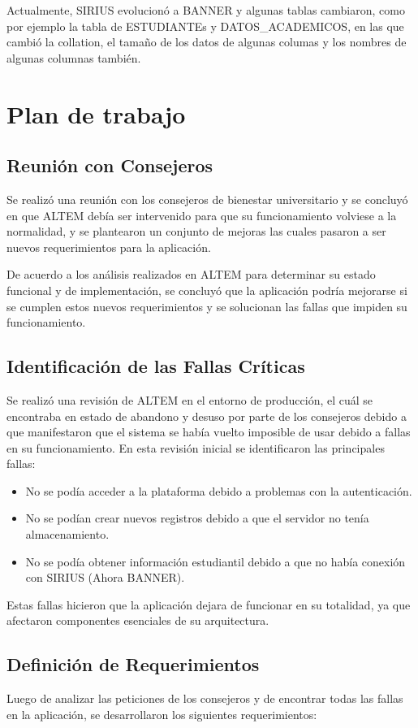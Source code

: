 Actualmente, SIRIUS evolucionó a BANNER y algunas tablas cambiaron, como por ejemplo la tabla de ESTUDIANTEs y DATOS\_ACADEMICOS, en las que cambió la collation, el tamaño de los datos de algunas columas y los nombres de algunas columnas también.

\section{Plan de trabajo}
\subsection{Reunión con Consejeros}
Se realizó una reunión con los consejeros de bienestar universitario y se concluyó en que ALTEM debía ser intervenido para que su funcionamiento volviese a la normalidad, y se plantearon un conjunto de mejoras las cuales pasaron a ser nuevos requerimientos para la aplicación.

De acuerdo a los análisis realizados en ALTEM para determinar su estado funcional y de implementación, se concluyó que la aplicación podría mejorarse si se cumplen estos nuevos requerimientos y se solucionan las fallas que impiden su funcionamiento.

\subsection{Identificación de las Fallas Críticas}
Se realizó una revisión de ALTEM en el entorno de producción, el cuál se encontraba en estado de abandono y desuso por parte de los consejeros debido a que manifestaron que el sistema se había vuelto imposible de usar debido a fallas en su funcionamiento. 
En esta revisión inicial se identificaron las principales fallas: 

\begin{itemize}
    \item No se podía acceder a la plataforma debido a problemas con la autenticación.
    \item No se podían crear nuevos registros debido a que el servidor no tenía almacenamiento.
    \item No se podía obtener información estudiantil debido a que no había conexión con SIRIUS (Ahora BANNER).
\end{itemize}

Estas fallas hicieron que la aplicación dejara de funcionar en su totalidad, ya que afectaron componentes esenciales de su arquitectura.

\subsection{Definición de Requerimientos}
Luego de analizar las peticiones de los consejeros y de encontrar todas las fallas en la aplicación, se desarrollaron los siguientes requerimientos:

